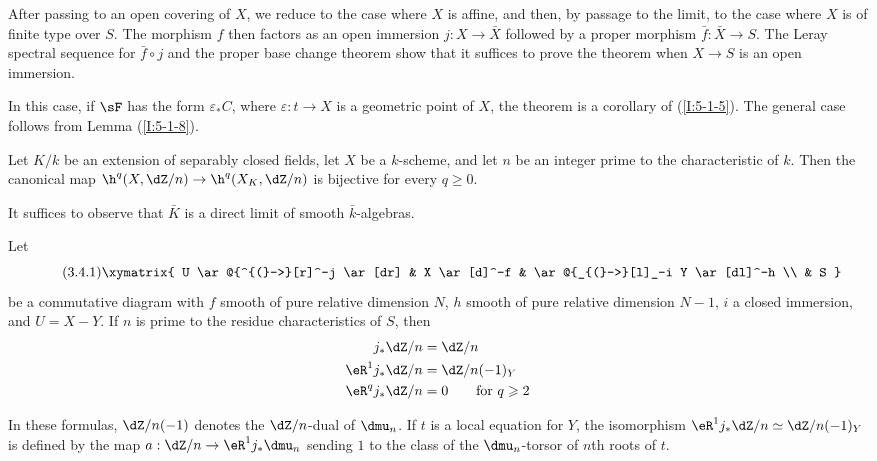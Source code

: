 After passing to an open covering of $X$, we reduce to the case where
$X$ is affine, and then, by passage to the limit, to the case where $X$
is of finite type over $S$. The morphism $f$ then factors as an open
immersion $j:X\to\bar X$ followed by a proper morphism
$\bar f:\bar X\to S$. The Leray spectral sequence for $\bar f\circ j$
and the proper base change theorem show that it suffices to prove the
theorem when $X\to S$ is an open immersion.

In this case, if $\sF$ has the form $\varepsilon_*C$, where
$\varepsilon:t\to X$ is a geometric point of $X$, the theorem is a
corollary of (\ref{I:5-1-5}). The general case follows from Lemma
(\ref{I:5-1-8}).

\begin{corollary}\label{I:5-3-3}
Let $K/k$ be an extension of separably closed fields, let $X$ be a
$k$-scheme, and let $n$ be an integer prime to the characteristic of
$k$. Then the canonical map
$\h^q(X,\dZ/n)\to\h^q(X_K,\dZ/n)$ is bijective for every
$q\geqslant0$.
\end{corollary}

It suffices to observe that $\bar K$ is a direct limit of smooth
$\bar k$-algebras.

\begin{theorem}\label{I:5-3-4}
Let
\begin{equation*}\tag{3.4.1}\label{I:eq:5-3-4-1}\xymatrix{
  U \ar@{^{(}->}[r]^-j \ar[dr]
    & X \ar[d]^-f
    & \ar@{_{(}->}[l]_-i Y \ar[dl]^-h \\
  & S
}\end{equation*}
be a commutative diagram with $f$ smooth of pure relative dimension $N$,
$h$ smooth of pure relative dimension $N-1$, $i$ a closed immersion,
and $U=X- Y$. If $n$ is prime to the residue characteristics of
$S$, then
\begin{equation*}
\begin{aligned}
  j_* \dZ/n     &= \dZ/n \\
  \eR^1 j_*\dZ/n &= \dZ/n(-1)_Y \\
  \eR^q j_*\dZ/n &= 0 \qquad \text{for $q\geqslant 2$}
\end{aligned}
\end{equation*}
\end{theorem}

In these formulas, $\dZ/n(-1)$ denotes the $\dZ/n$-dual of $\dmu_n$.
If $t$ is a local equation for $Y$, the isomorphism
$\eR^1j_*\dZ/n\simeq\dZ/n(-1)_Y$ is defined by the map
$a:\dZ/n\to\eR^1j_*\dmu_n$ sending $1$ to the class of the
$\dmu_n$-torsor of $n$th roots of $t$.

